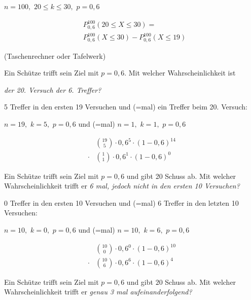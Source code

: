 \documentclass[paper=a6,ngerman,twoside=true,fontsize=14pt, parskip = half]{scrartcl}
\begin{document}
\begin{antwort}
	$n=100,$ $20\leq k\leq 30,$ $p=0,6$
	
	\bigskip
	\begin{align*}
		&P^{100}_{0,6}(20\leq X \leq30) = \\
	&P^{100}_{0,6}(X\leq30)-P^{100}_{0,6}(X\leq19)
	\end{align*}

	(Taschenrechner oder Tafelwerk)
\end{antwort}
\begin{frage}
	Ein Schütze trifft sein Ziel mit $p=0,6$. Mit welcher Wahrscheinlichkeit ist 
	
	\emph{der 20. Versuch der 6. Treffer?}
	
\end{frage}
\begin{antwort}
	5 Treffer in den ersten 19 Versuchen und (=mal) ein Treffer beim 20. Versuch:
	
	$n=19,$ $k=5,$ $p=0,6$ und (=mal) $n=1,$ $k=1,$ $p=0,6$
	
	\bigskip
	\begin{align*}
	&\binom{19}{5} \cdot 0,6^{5} \cdot (1-0,6)^{14} \\
	\bm{\cdot} &\binom{1}{1} \cdot 0,6^{1} \cdot (1-0,6)^{0}
	\end{align*}
		
\end{antwort}
\begin{frage}
	Ein Schütze trifft sein Ziel mit $p=0,6$ und gibt 20 Schuss ab. Mit welcher Wahrscheinlichkeit trifft er  
	\emph{6 mal, jedoch nicht in den ersten 10 Versuchen?}
	
\end{frage}
\begin{antwort}
	0 Treffer in den ersten 10 Versuchen und (=mal) 6 Treffer in den letzten 10 Versuchen:
	
	$n=10,$ $k=0,$ $p=0,6$ und (=mal) $n=10,$ $k=6,$ $p=0,6$
	
	\bigskip
	\begin{align*}
	&\binom{10}{0} \cdot 0,6^{0} \cdot (1-0,6)^{10} \\
	\bm{\cdot} &\binom{10}{6} \cdot 0,6^{6} \cdot (1-0,6)^{4}
	\end{align*}
	
\end{antwort}
\begin{frage}
	Ein Schütze trifft sein Ziel mit $p=0,6$ und gibt $20$ Schuss ab. 
	Mit welcher Wahrscheinlichkeit trifft er 
	\emph{genau 3 mal aufeinanderfolgend?}
	
\end{frage}
\end{document}
